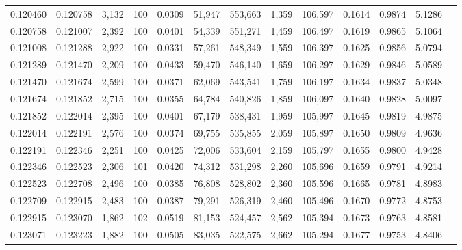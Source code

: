 \begin{tabular}{rrrrrrrrrrrrr}
0.120460 & 0.120758 & 3,132 & 100 &                                     0.0309 &  51,947 & 553,663 &   1,359 & 106,597 & 0.1614 & 0.9874 & 5.1286 \\
0.120758 & 0.121007 & 2,392 & 100 &                                     0.0401 &  54,339 & 551,271 &   1,459 & 106,497 & 0.1619 & 0.9865 & 5.1064 \\
0.121008 & 0.121288 & 2,922 & 100 &                                     0.0331 &  57,261 & 548,349 &   1,559 & 106,397 & 0.1625 & 0.9856 & 5.0794 \\
0.121289 & 0.121470 & 2,209 & 100 &                                     0.0433 &  59,470 & 546,140 &   1,659 & 106,297 & 0.1629 & 0.9846 & 5.0589 \\
0.121470 & 0.121674 & 2,599 & 100 &                                     0.0371 &  62,069 & 543,541 &   1,759 & 106,197 & 0.1634 & 0.9837 & 5.0348 \\
0.121674 & 0.121852 & 2,715 & 100 &                                     0.0355 &  64,784 & 540,826 &   1,859 & 106,097 & 0.1640 & 0.9828 & 5.0097 \\
0.121852 & 0.122014 & 2,395 & 100 &                                     0.0401 &  67,179 & 538,431 &   1,959 & 105,997 & 0.1645 & 0.9819 & 4.9875 \\
0.122014 & 0.122191 & 2,576 & 100 &                                     0.0374 &  69,755 & 535,855 &   2,059 & 105,897 & 0.1650 & 0.9809 & 4.9636 \\
0.122191 & 0.122346 & 2,251 & 100 &                                     0.0425 &  72,006 & 533,604 &   2,159 & 105,797 & 0.1655 & 0.9800 & 4.9428 \\
0.122346 & 0.122523 & 2,306 & 101 &                                     0.0420 &  74,312 & 531,298 &   2,260 & 105,696 & 0.1659 & 0.9791 & 4.9214 \\
0.122523 & 0.122708 & 2,496 & 100 &                                     0.0385 &  76,808 & 528,802 &   2,360 & 105,596 & 0.1665 & 0.9781 & 4.8983 \\
0.122709 & 0.122915 & 2,483 & 100 &                                     0.0387 &  79,291 & 526,319 &   2,460 & 105,496 & 0.1670 & 0.9772 & 4.8753 \\
0.122915 & 0.123070 & 1,862 & 102 &                                     0.0519 &  81,153 & 524,457 &   2,562 & 105,394 & 0.1673 & 0.9763 & 4.8581 \\
0.123071 & 0.123223 & 1,882 & 100 &                                     0.0505 &  83,035 & 522,575 &   2,662 & 105,294 & 0.1677 & 0.9753 & 4.8406 \\

\end{tabular}
